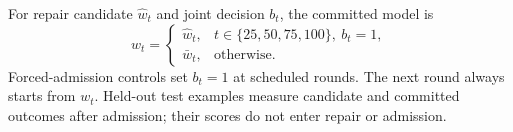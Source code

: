 For repair candidate $\widehat w_t$ and joint decision $b_t$, the committed model is
\begin{equation}
 w_t=\begin{cases}\widehat w_t,&t\in\{25,50,75,100\},\ b_t=1,\\
                   \bar w_t,&\text{otherwise}.
      \end{cases}
\end{equation}
Forced-admission controls set $b_t=1$ at scheduled rounds. The next round always starts from $w_t$. Held-out test examples measure candidate and committed outcomes after admission; their scores do not enter repair or admission.

